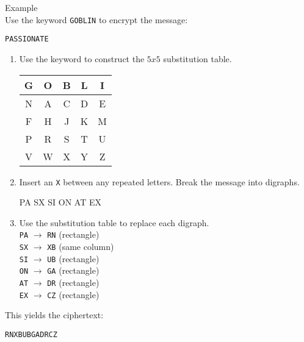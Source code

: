 \begin{minipage}{6cm}\raggedright
\textsf{\LARGE Example}\\[1.0ex]
Use the keyword \texttt{GOBLIN} to encrypt the message:
\begin{center}
\texttt{PASSIONATE}\\[1.25ex]
\end{center}

\begin{enumerate}[leftmargin=*]
\item Use the keyword to construct the $5x5$ substitution table.

\ttfamily
\begin{center}
\begin{tabular}{*{5}{|c}|}\hline
G & O & B & L & I \\\hline
N & A & C & D & E \\\hline
F & H & J & K & M \\\hline
P & R & S & T & U \\\hline
V & W & X & Y & Z \\\hline
\end{tabular}
\end{center}
\rmfamily

\item Insert an \texttt{X} between any repeated letters. Break the message into digraphs.
\ttfamily
\begin{center}
PA SX SI ON AT EX
\end{center}
\rmfamily

\item Use the substitution table to replace each digraph.\\[1.25ex]

\qquad \texttt{PA} $\rightarrow$ \texttt{RN} \quad (rectangle)\\
\qquad \texttt{SX} $\rightarrow$ \texttt{XB} \quad (same column)\\
\qquad \texttt{SI} $\rightarrow$ \texttt{UB} \quad (rectangle)\\
\qquad \texttt{ON} $\rightarrow$ \texttt{GA} \quad (rectangle) \\
\qquad \texttt{AT} $\rightarrow$ \texttt{DR} \quad (rectangle)\\
\qquad \texttt{EX} $\rightarrow$ \texttt{CZ} \quad (rectangle)\\

\end{enumerate}

This yields the ciphertext:
\begin{center}
\texttt{RNXBUBGADRCZ}
\end{center}
\end{minipage}